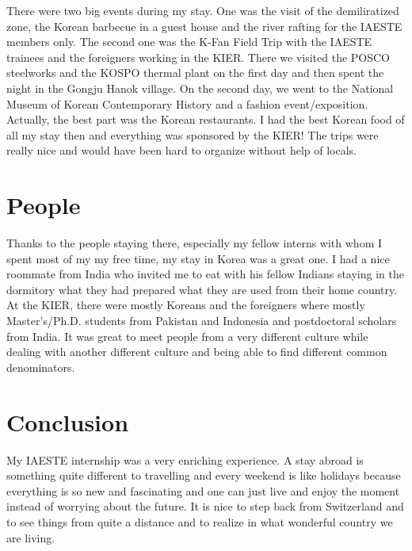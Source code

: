 There were two big events during my stay. One was the visit of the demiliratized zone, the Korean barbecue in a guest house and the river rafting for the IAESTE members only. The second one was the K-Fan Field Trip with the IAESTE trainees and the foreigners working in the KIER. There we visited the POSCO steelworks and the KOSPO thermal plant on the first day and then spent the night in the Gongju Hanok village. On the second day, we went to the National Museum of Korean Contemporary History and a fashion event/exposition. Actually, the best part was the Korean restaurants. I had the best Korean food of all my stay then and everything was sponsored by the KIER! The trips were really nice and would have been hard to organize without help of locals.
\section*{People}
Thanks to the people staying there, especially my fellow interns with whom I spent most of my my free time, my stay in Korea was a great one. I had a nice roommate from India who invited me to eat with his fellow Indians staying in the dormitory what they had prepared what they are used from their home country. At the KIER, there were mostly Koreans and the foreigners where mostly Master's/Ph.D. students from Pakistan and Indonesia and postdoctoral scholars from India. It was great to meet people from a very different culture while dealing with another different culture and being able to find different common denominators. 
\section*{Conclusion}
My IAESTE internship was a very enriching experience. A stay abroad is something quite different to travelling and every weekend is like holidays because everything is so new and fascinating and one can just live and enjoy the moment instead of worrying about the future. It is nice to step back from Switzerland and to see things from quite a distance and to realize in what wonderful country we are living.
\appendix
\onecolumn
